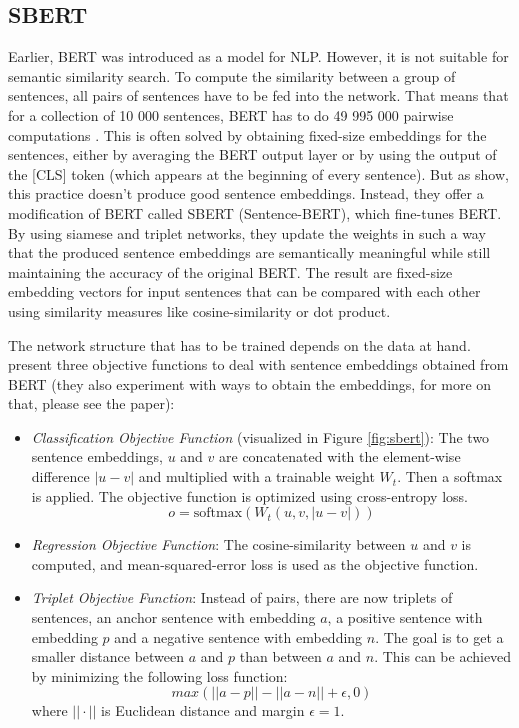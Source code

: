 \subsection{SBERT}\label{sbert}

Earlier, BERT was introduced as a model for NLP. However, it is not suitable for semantic similarity search. To compute the similarity between a group of sentences, all pairs of sentences have to be fed into the network. That means that for a collection of 10 000 sentences, BERT has to do 49 995 000 pairwise computations \citep{reimers2019sbert}. This is often solved by obtaining fixed-size embeddings for the sentences, either by averaging the BERT output layer or by using the output of the [CLS] token (which appears at the beginning of every sentence). But as \citet{reimers2019sbert} show, this practice doesn’t produce good sentence embeddings.
Instead, they offer a modification of BERT called SBERT (Sentence-BERT), which fine-tunes BERT. By using siamese and triplet networks, they update the weights in such a way that the produced sentence embeddings are semantically meaningful while still maintaining the accuracy of the original BERT. The result are fixed-size embedding vectors for input sentences that can be compared with each other using similarity measures like cosine-similarity or dot product.

The network structure that has to be trained depends on the data at hand. \citet{reimers2019sbert} present three objective functions to deal with sentence embeddings obtained from BERT (they also experiment with ways to obtain the embeddings, for more on that, please see the paper):
\begin{itemize}
    \item \textit{Classification Objective Function} (visualized in Figure \ref{fig:sbert}):
    The two sentence embeddings, $u$ and $v$ are concatenated with the element-wise difference $|u-v|$ and multiplied with a trainable weight $W_t$. Then a softmax is applied. The objective function is optimized using cross-entropy loss.
    \begin{equation}
    o=\text{softmax}(W_t (u,v,|u-v|))
    \end{equation}
    \item \textit{Regression Objective Function}:
    The cosine-similarity between $u$ and $v$ is computed, and mean-squared-error loss is used as the objective function.
    \item \textit{Triplet Objective Function}:
    Instead of pairs, there are now triplets of sentences, an anchor sentence with embedding $a$, a positive sentence with embedding $p$ and a negative sentence with embedding $n$. The goal is to get a smaller distance between $a$ and $p$ than between $a$ and $n$. This can be achieved by minimizing the following loss function:
    \begin{equation}
    max(||a-p||-||a-n||+\epsilon,0)
    \end{equation}
    where $||\cdot||$ is Euclidean distance and margin $\epsilon = 1$.
\end{itemize}

